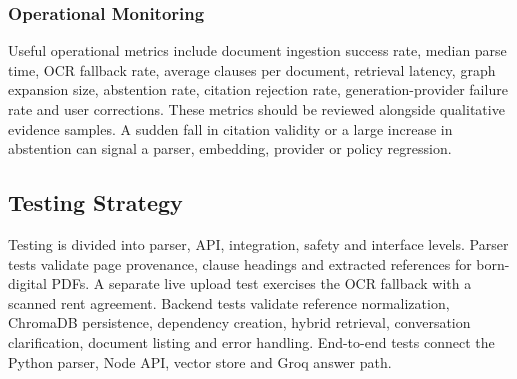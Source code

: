 \documentclass[12pt,a4paper,oneside]{report}
\begin{document}
\subsubsection{Operational Monitoring}
Useful operational metrics include document ingestion success rate, median parse time, OCR fallback rate, average clauses per document, retrieval latency, graph expansion size, abstention rate, citation rejection rate, generation-provider failure rate and user corrections. These metrics should be reviewed alongside qualitative evidence samples. A sudden fall in citation validity or a large increase in abstention can signal a parser, embedding, provider or policy regression.

\subsection{Testing Strategy}
Testing is divided into parser, API, integration, safety and interface levels. Parser tests validate page provenance, clause headings and extracted references for born-digital PDFs. A separate live upload test exercises the OCR fallback with a scanned rent agreement. Backend tests validate reference normalization, ChromaDB persistence, dependency creation, hybrid retrieval, conversation clarification, document listing and error handling. End-to-end tests connect the Python parser, Node API, vector store and Groq answer path.
\end{document}
